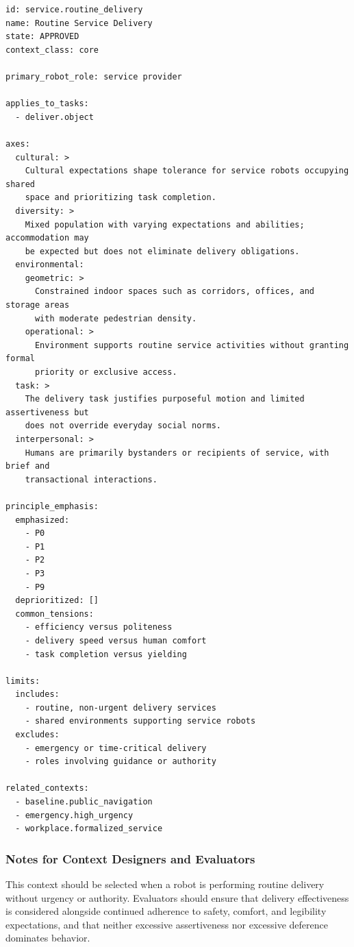 \documentclass[utf8]{frontiers_suppmat} %
\begin{document}
\begin{lstlisting}[style=literatecard]
id: service.routine_delivery
name: Routine Service Delivery
state: APPROVED
context_class: core

primary_robot_role: service provider

applies_to_tasks:
  - deliver.object

axes:
  cultural: >
    Cultural expectations shape tolerance for service robots occupying shared
    space and prioritizing task completion.
  diversity: >
    Mixed population with varying expectations and abilities; accommodation may
    be expected but does not eliminate delivery obligations.
  environmental:
    geometric: >
      Constrained indoor spaces such as corridors, offices, and storage areas
      with moderate pedestrian density.
    operational: >
      Environment supports routine service activities without granting formal
      priority or exclusive access.
  task: >
    The delivery task justifies purposeful motion and limited assertiveness but
    does not override everyday social norms.
  interpersonal: >
    Humans are primarily bystanders or recipients of service, with brief and
    transactional interactions.

principle_emphasis:
  emphasized:
    - P0
    - P1
    - P2
    - P3
    - P9
  deprioritized: []
  common_tensions:
    - efficiency versus politeness
    - delivery speed versus human comfort
    - task completion versus yielding

limits:
  includes:
    - routine, non-urgent delivery services
    - shared environments supporting service robots
  excludes:
    - emergency or time-critical delivery
    - roles involving guidance or authority

related_contexts:
  - baseline.public_navigation
  - emergency.high_urgency
  - workplace.formalized_service
\end{lstlisting}

\subsubsection{Notes for Context Designers and
Evaluators}\label{notes-for-context-designers-and-evaluators}

This context should be selected when a robot is performing routine
delivery without urgency or authority. Evaluators should ensure that
delivery effectiveness is considered alongside continued adherence to
safety, comfort, and legibility expectations, and that neither excessive
assertiveness nor excessive deference dominates behavior.
\end{document}
